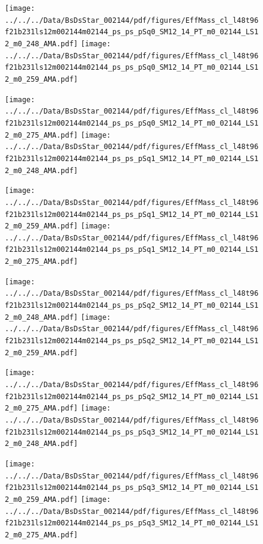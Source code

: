 \documentclass[a4paper,10pt]{article}
\begin{document}
\begin{figure}[p]
 \texttt{[image: ../../../Data/BsDsStar\_002144/pdf/figures/EffMass\_cl\_l48t96f21b231ls12m002144m02144\_ps\_ps\_pSq0\_SM12\_14\_PT\_m0\_02144\_LS12\_m0\_248\_AMA.pdf]} 
 \texttt{[image: ../../../Data/BsDsStar\_002144/pdf/figures/EffMass\_cl\_l48t96f21b231ls12m002144m02144\_ps\_ps\_pSq0\_SM12\_14\_PT\_m0\_02144\_LS12\_m0\_259\_AMA.pdf]} 
 \end{figure}
\begin{figure}[p]
 \texttt{[image: ../../../Data/BsDsStar\_002144/pdf/figures/EffMass\_cl\_l48t96f21b231ls12m002144m02144\_ps\_ps\_pSq0\_SM12\_14\_PT\_m0\_02144\_LS12\_m0\_275\_AMA.pdf]} 
 \texttt{[image: ../../../Data/BsDsStar\_002144/pdf/figures/EffMass\_cl\_l48t96f21b231ls12m002144m02144\_ps\_ps\_pSq1\_SM12\_14\_PT\_m0\_02144\_LS12\_m0\_248\_AMA.pdf]} 
 \end{figure}
\begin{figure}[p]
 \texttt{[image: ../../../Data/BsDsStar\_002144/pdf/figures/EffMass\_cl\_l48t96f21b231ls12m002144m02144\_ps\_ps\_pSq1\_SM12\_14\_PT\_m0\_02144\_LS12\_m0\_259\_AMA.pdf]} 
 \texttt{[image: ../../../Data/BsDsStar\_002144/pdf/figures/EffMass\_cl\_l48t96f21b231ls12m002144m02144\_ps\_ps\_pSq1\_SM12\_14\_PT\_m0\_02144\_LS12\_m0\_275\_AMA.pdf]} 
 \end{figure}
\clearpage
\begin{figure}[p]
 \texttt{[image: ../../../Data/BsDsStar\_002144/pdf/figures/EffMass\_cl\_l48t96f21b231ls12m002144m02144\_ps\_ps\_pSq2\_SM12\_14\_PT\_m0\_02144\_LS12\_m0\_248\_AMA.pdf]} 
 \texttt{[image: ../../../Data/BsDsStar\_002144/pdf/figures/EffMass\_cl\_l48t96f21b231ls12m002144m02144\_ps\_ps\_pSq2\_SM12\_14\_PT\_m0\_02144\_LS12\_m0\_259\_AMA.pdf]} 
 \end{figure}
\begin{figure}[p]
 \texttt{[image: ../../../Data/BsDsStar\_002144/pdf/figures/EffMass\_cl\_l48t96f21b231ls12m002144m02144\_ps\_ps\_pSq2\_SM12\_14\_PT\_m0\_02144\_LS12\_m0\_275\_AMA.pdf]} 
 \texttt{[image: ../../../Data/BsDsStar\_002144/pdf/figures/EffMass\_cl\_l48t96f21b231ls12m002144m02144\_ps\_ps\_pSq3\_SM12\_14\_PT\_m0\_02144\_LS12\_m0\_248\_AMA.pdf]} 
 \end{figure}
\begin{figure}[p]
 \texttt{[image: ../../../Data/BsDsStar\_002144/pdf/figures/EffMass\_cl\_l48t96f21b231ls12m002144m02144\_ps\_ps\_pSq3\_SM12\_14\_PT\_m0\_02144\_LS12\_m0\_259\_AMA.pdf]} 
 \texttt{[image: ../../../Data/BsDsStar\_002144/pdf/figures/EffMass\_cl\_l48t96f21b231ls12m002144m02144\_ps\_ps\_pSq3\_SM12\_14\_PT\_m0\_02144\_LS12\_m0\_275\_AMA.pdf]} 
 \end{figure}
\end{document}
